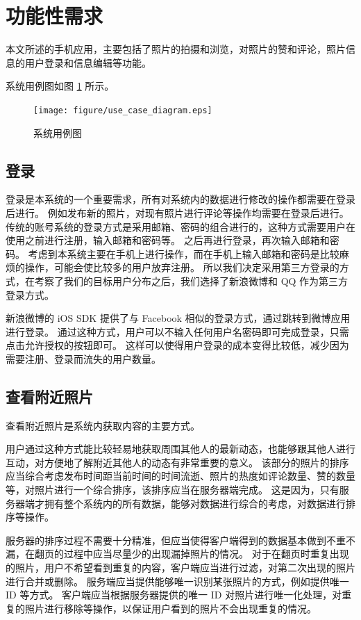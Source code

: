 \section{功能性需求}

本文所述的手机应用，主要包括了照片的拍摄和浏览，对照片的赞和评论，照片信息的用户登录和信息编辑等功能。

系统用例图如图 \ref{use-case-diagram} 所示。

\begin{figure}[h!]
    \centering
    \texttt{[image: figure/use\_case\_diagram.eps]}
    \caption{系统用例图}
    \label{use-case-diagram}
\end{figure}

\subsection{登录}

登录是本系统的一个重要需求，所有对系统内的数据进行修改的操作都需要在登录后进行。
例如发布新的照片，对现有照片进行评论等操作均需要在登录后进行。
传统的账号系统的登录方式是采用邮箱、密码的组合进行的，这种方式需要用户在使用之前进行注册，输入邮箱和密码等。
之后再进行登录，再次输入邮箱和密码。
考虑到本系统主要在手机上进行操作，而在手机上输入邮箱和密码是比较麻烦的操作，可能会使比较多的用户放弃注册。
所以我们决定采用第三方登录的方式，在考察了我们的目标用户分布之后，我们选择了新浪微博和 QQ 作为第三方登录方式。

新浪微博的 iOS SDK 提供了与 Facebook 相似的登录方式，通过跳转到微博应用进行登录。
通过这种方式，用户可以不输入任何用户名密码即可完成登录，只需点击允许授权的按钮即可。
这样可以使得用户登录的成本变得比较低，减少因为需要注册、登录而流失的用户数量。

\subsection{查看附近照片}

查看附近照片是系统内获取内容的主要方式。

用户通过这种方式能比较轻易地获取周围其他人的最新动态，也能够跟其他人进行互动，对方便地了解附近其他人的动态有非常重要的意义。
该部分的照片的排序应当综合考虑发布时间距当前时间的时间流逝、照片的热度如评论数量、赞的数量等，对照片进行一个综合排序，该排序应当在服务器端完成。
这是因为，只有服务器端才拥有整个系统内的所有数据，能够对数据进行综合的考虑，对数据进行排序等操作。

服务器的排序过程不需要十分精准，但应当使得客户端得到的数据基本做到不重不漏，在翻页的过程中应当尽量少的出现漏掉照片的情况。
对于在翻页时重复出现的照片，用户不希望看到重复的内容，客户端应当进行过滤，对第二次出现的照片进行合并或删除。
服务端应当提供能够唯一识别某张照片的方式，例如提供唯一 ID 等方式。
客户端应当根据服务器提供的唯一 ID 对照片进行唯一化处理，对重复的照片进行移除等操作，以保证用户看到的照片不会出现重复的情况。

